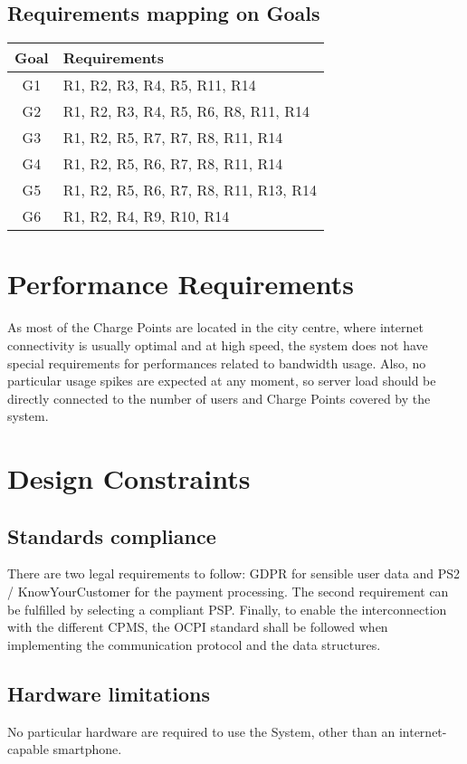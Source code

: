 \subsection{Requirements mapping on Goals}
\begin{tabular}{|c|l|}
	\hline
	\bf{Goal} & \bf{Requirements}\\
	\hline
	G1 & R1, R2, R3, R4, R5, R11, R14 \\
	G2 & R1, R2, R3, R4, R5, R6, R8, R11, R14 \\
	G3 & R1, R2, R5, R7, R7, R8, R11, R14 \\
	G4 & R1, R2, R5, R6, R7, R8, R11, R14 \\
	G5 & R1, R2, R5, R6, R7, R8, R11, R13, R14 \\
	G6 & R1, R2, R4, R9, R10, R14 \\
	\hline
\end{tabular}

\clearpage
\newpage

\section{Performance Requirements}
As most of the Charge Points are located in the city centre, where internet connectivity is usually optimal and at high speed, the system does not have special requirements for performances related to bandwidth usage. 
Also, no particular usage spikes are expected at any moment, so server load should be directly connected to the number of users and Charge Points covered by the system.

\section{Design Constraints}
\subsection{Standards compliance}
There are two legal requirements to follow:
GDPR for sensible user data and PS2 / KnowYourCustomer for the payment processing. The second requirement can be fulfilled by selecting a compliant PSP.
Finally, to enable the interconnection with the different CPMS, the OCPI standard shall be followed when implementing the communication protocol and the data structures.

\subsection{Hardware limitations}
No particular hardware are required to use the System, other than an internet-capable smartphone.

